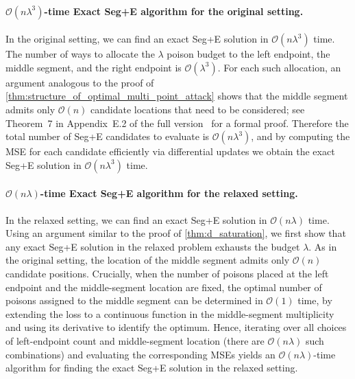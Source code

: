 \documentclass[acmsmall]{acmart}
\begin{document}
\paragraph{$\mathcal{O}(n\lambda^3)$-time Exact Seg+E algorithm for the original setting.}
In the original setting, we can find an exact Seg+E solution in $\mathcal{O}(n\lambda^3)$ time.
The number of ways to allocate the $\lambda$ poison budget to the left endpoint, the middle segment, and the right endpoint is $\mathcal{O}(\lambda^3)$.
For each such allocation, an argument analogous to the proof of \cref{thm:structure_of_optimal_multi_point_attack} shows that the middle segment admits only $\mathcal{O}(n)$ candidate locations that need to be considered;
see Theorem~7 in Appendix~E.2 of the full version~\cite{sato2026mathematical_arxiv} for a formal proof.
Therefore the total number of Seg+E candidates to evaluate is $\mathcal{O}(n\lambda^3)$, and by computing the MSE for each candidate efficiently via differential updates we obtain the exact Seg+E solution in $\mathcal{O}(n\lambda^3)$ time.

\paragraph{$\mathcal{O}(n\lambda)$-time Exact Seg+E algorithm for the relaxed setting.}
In the relaxed setting, we can find an exact Seg+E solution in $\mathcal{O}(n\lambda)$ time.
Using an argument similar to the proof of \cref{thm:d_saturation}, we first show that any exact Seg+E solution in the relaxed problem exhausts the budget $\lambda$.
As in the original setting, the location of the middle segment admits only $\mathcal{O}(n)$ candidate positions.
Crucially, when the number of poisons placed at the left endpoint and the middle-segment location are fixed, the optimal number of poisons assigned to the middle segment can be determined in $\mathcal{O}(1)$ time, by extending the loss to a continuous function in the middle-segment multiplicity and using its derivative to identify the optimum.
Hence, iterating over all choices of left-endpoint count and middle-segment location (there are $\mathcal{O}(n\lambda)$ such combinations) and evaluating the corresponding MSEs yields an $\mathcal{O}(n\lambda)$-time algorithm for finding the exact Seg+E solution in the relaxed setting.
\end{document}
